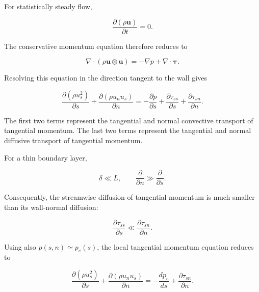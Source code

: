 For statistically steady flow,

\begin{equation}
    \frac{\partial(\rho\boldsymbol{u})}{\partial t}=0.
    \label{eq:steady_momentum_condition}
\end{equation}

The conservative momentum equation therefore reduces to

\begin{equation}
    \nabla\cdot
    \left(
        \rho\boldsymbol{u}\otimes\boldsymbol{u}
    \right)
    =
    -\nabla p
    +
    \nabla\cdot\boldsymbol{\tau}.
    \label{eq:steady_conservative_momentum}
\end{equation}

Resolving this equation in the direction tangent to the wall gives

\begin{equation}
    \frac{\partial(\rho u_s^2)}{\partial s}
    +
    \frac{\partial(\rho u_nu_s)}{\partial n}
    =
    -\frac{\partial p}{\partial s}
    +
    \frac{\partial\tau_{ss}}{\partial s}
    +
    \frac{\partial\tau_{sn}}{\partial n}.
    \label{eq:local_tangential_momentum}
\end{equation}

The first two terms represent the tangential and normal convective transport
of tangential momentum. The last two terms represent the tangential and normal
diffusive transport of tangential momentum.

For a thin boundary layer,

\begin{equation}
    \delta\ll L,
    \qquad
    \frac{\partial}{\partial n}
    \gg
    \frac{\partial}{\partial s}.
    \label{eq:thin_BL_scale}
\end{equation}

Consequently, the streamwise diffusion of tangential momentum is much smaller
than its wall-normal diffusion:

\begin{equation}
    \frac{\partial\tau_{ss}}{\partial s}
    \ll
    \frac{\partial\tau_{sn}}{\partial n}.
    \label{eq:negligible_streamwise_diffusion}
\end{equation}

Using also \(p(s,n)\simeq p_e(s)\), the local tangential momentum equation
reduces to

\begin{equation}
    \boxed{
    \frac{\partial(\rho u_s^2)}{\partial s}
    +
    \frac{\partial(\rho u_nu_s)}{\partial n}
    =
    -\frac{dp_e}{ds}
    +
    \frac{\partial\tau_{sn}}{\partial n}
    }.
    \label{eq:reduced_tangential_momentum}
\end{equation}

